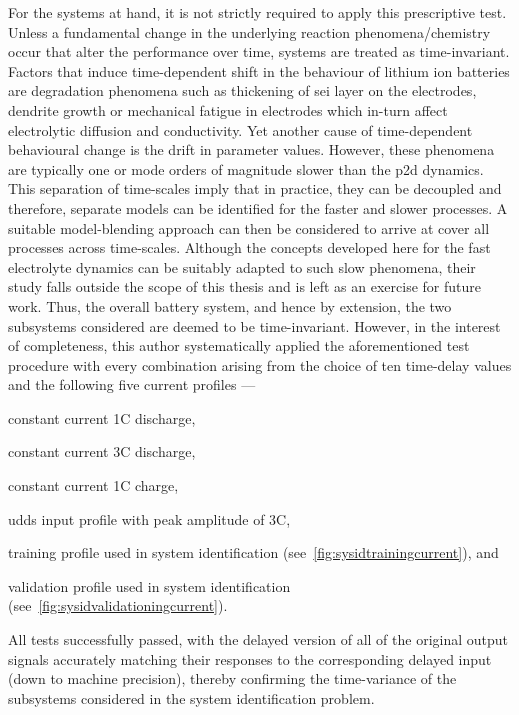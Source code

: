 For  the  systems   at  hand,  it  is  not  strictly   required  to  apply  this
prescriptive  test.  Unless a  fundamental  change  in the  underlying  reaction
phenomena/chemistry  occur that  alter the  performance over  time, systems  are
treated  as time-invariant.  Factors  that induce  time-dependent  shift in  the
behaviour of lithium ion batteries  are degradation phenomena such as thickening
of \gls{sei} layer  on the electrodes, dendrite growth or  mechanical fatigue in
electrodes  which in-turn  affect electrolytic  diffusion and  conductivity. Yet
another cause  of time-dependent  behavioural change is  the drift  in parameter
values. However, these  phenomena are typically one or mode  orders of magnitude
slower than  the \gls{p2d} dynamics.  This separation of
time-scales  imply  that in  practice,  they  can  be decoupled  and  therefore,
separate  models can  be  identified  for the  faster  and  slower processes.  A
suitable model-blending approach  can then be considered to arrive  at cover all
processes across time-scales. Although the  concepts developed here for the fast
electrolyte dynamics can be suitably adapted to such slow phenomena, their study
falls outside  the scope of this  thesis and is  left as an exercise  for future
work.  Thus,  the overall  battery  system,  and  hence  by extension,  the  two
subsystems considered are deemed to  be time-invariant. However, in the interest
of  completeness, this  author  systematically applied  the aforementioned  test
procedure  with every  combination arising  from  the choice  of ten  time-delay
values and the following five current profiles ---
\begin{enumerate*}[label=\emph{\alph*})]
    \item constant current 1C discharge,
    \item constant current 3C discharge,
    \item constant current 1C charge,
    \item \gls{udds} input profile with peak amplitude of 3C,
    \item training profile used in system identification (see~\cref{fig:sysidtrainingcurrent}), and
    \item validation profile used in system identification (see~\cref{fig:sysidvalidationingcurrent}).
\end{enumerate*}
All tests successfully  passed, with the delayed version of  all of the original
output signals accurately matching their  responses to the corresponding delayed
input (down to  machine precision), thereby confirming the  time-variance of the
subsystems considered in the system identification problem.


